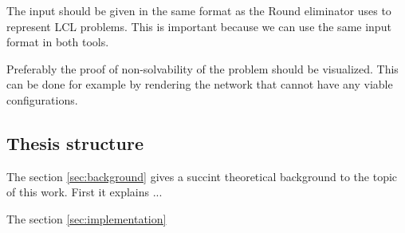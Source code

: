 The input should be given in the same format as the Round eliminator uses to represent LCL problems.
This is important because we can use the same input format in both tools.

Preferably the proof of non-solvability of the problem should be visualized.
This can be done for example by rendering the network that cannot have any viable configurations.

\subsection{Thesis structure}
The section \ref{sec:background} gives a succint theoretical background to the topic of this work.
First it explains ... %

The section \ref{sec:implementation}

